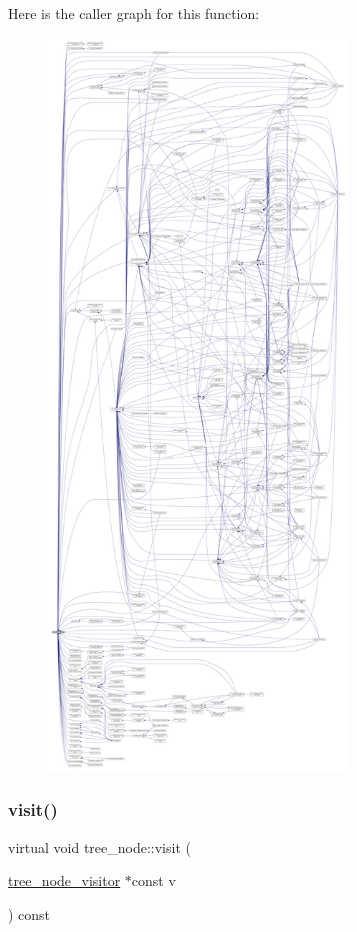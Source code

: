 Here is the caller graph for this function\+:
\nopagebreak
\begin{figure}[H]
\begin{center}
\leavevmode
\includegraphics[height=550pt]{df/dbf/classtree__node_a17760b9b2ecf3ad8bfd015ce90f60234_icgraph}
\end{center}
\end{figure}
\mbox{\label{classtree__node_aa9abba3f1b30e0be80b4a56b188c6ecc}} 
\subsubsection{\texorpdfstring{visit()}{visit()}}
{\footnotesize\ttfamily virtual void tree\+\_\+node\+::visit (\begin{DoxyParamCaption}\item[{\hyperlink{classtree__node__visitor}{tree\+\_\+node\+\_\+visitor} $\ast$const}]{v }\end{DoxyParamCaption}) const\hspace{0.3cm}{\ttfamily [virtual]}}




